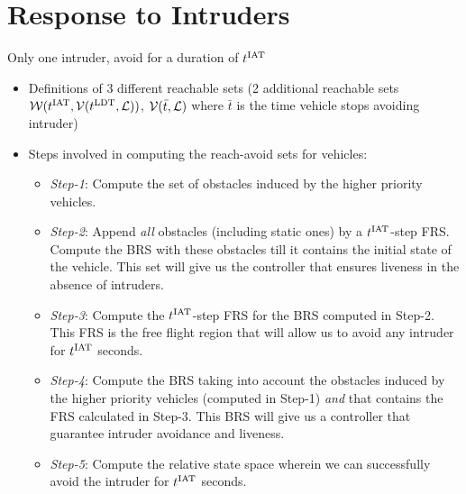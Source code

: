 \section{Response to Intruders \label{sec:HJIVI}}
\begin{assumption}
\label{as:avoidOnce}
Only one intruder, avoid for a duration of $t^\text{IAT}$
\end{assumption}

\begin{itemize}
\item Definitions of 3 different reachable sets (2 additional reachable sets $\mathcal{W}(t^\text{IAT}, \mathcal{V}(t^\text{LDT}, \mathcal{L}))$, $\mathcal{V}(\bar t, \mathcal{L})$ where $\bar t$ is the time vehicle stops avoiding intruder)

\item Steps involved in computing the reach-avoid sets for vehicles:
\begin{itemize}
\item \textit{Step-1}: Compute the set of obstacles induced by the higher priority vehicles. 
\item \textit{Step-2}: Append \textit{all} obstacles (including static ones) by a $t^\text{IAT}$-step FRS. Compute the BRS with these obstacles till it contains the initial state of the vehicle. This set will give us the controller that ensures liveness in the absence of intruders. 
\item \textit{Step-3}: Compute the $t^\text{IAT}$-step FRS for the BRS computed in Step-2. This FRS is the free flight region that will allow us to avoid any intruder for $t^\text{IAT}$ seconds. 
\item \textit{Step-4}: Compute the BRS taking into account the obstacles induced by the higher priority vehicles (computed in Step-1) \textit{and} that contains the FRS calculated in Step-3. This BRS will give us a controller that guarantee intruder avoidance and liveness. 
\item \textit{Step-5}: Compute the relative state space wherein we can successfully avoid the intruder for $t^\text{IAT}$ seconds. 
\end{itemize}
\end{itemize}


